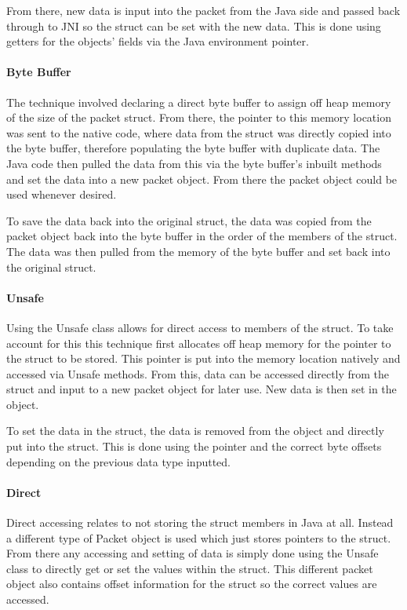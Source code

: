 \documentclass[final_report.tex]{subfiles}
\begin{document}
From there, new data is input into the packet from the Java side and passed back through to JNI so the struct can be set with the new data. This is done using getters for the objects' fields via the Java environment pointer.

\paragraph*{Byte Buffer}
The technique involved declaring a direct byte buffer to assign off heap memory of the size of the packet struct. From there, the pointer to this memory location was sent to the native code, where data from the struct was directly copied into the byte buffer, therefore populating the byte buffer with duplicate data. The Java code then pulled the data from this via the byte buffer's inbuilt methods and set the data into a new packet object. From there the packet object could be used whenever desired.

To save the data back into the original struct, the data was copied from the packet object back into the byte buffer in the order of the members of the struct. The data was then pulled from the memory of the byte buffer and set back into the original struct.

\paragraph*{Unsafe}
Using the Unsafe class allows for direct access to members of the struct. To take account for this this technique first allocates off heap memory for the pointer to the struct to be stored. This pointer is put into the memory location natively and accessed via Unsafe methods. From this, data can be accessed directly from the struct and input to a new packet object for later use. New data is then set in the object.

To set the data in the struct, the data is removed from the object and directly put into the struct. This is done using the pointer and the correct byte offsets depending on the previous data type inputted.

\paragraph*{Direct}
Direct accessing relates to not storing the struct members in Java at all. Instead a different type of Packet object is used which just stores pointers to the struct. From there any accessing and setting of data is simply done using the Unsafe class to directly get or set the values within the struct. This different packet object also contains offset information for the struct so the correct values are accessed.
\end{document}
